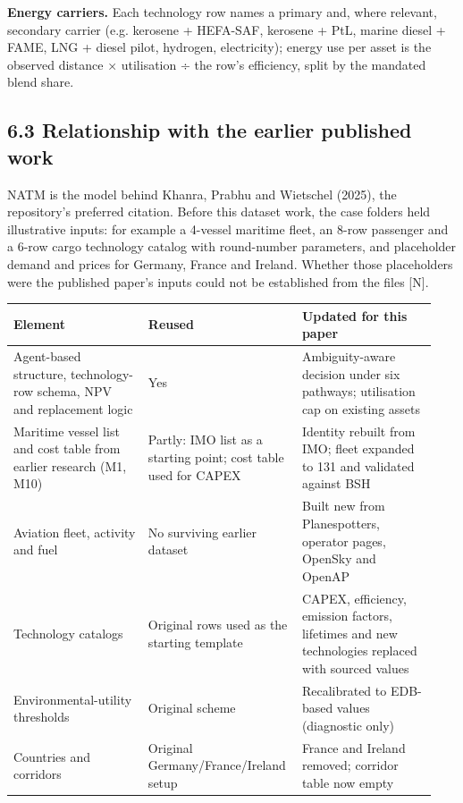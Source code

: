 \documentclass[11pt,a4paper]{article}
\begin{document}
\textbf{Energy carriers.} Each technology row names a primary and, where relevant, secondary carrier (e.g. kerosene + HEFA-SAF, kerosene + PtL, marine diesel + FAME, LNG + diesel pilot, hydrogen, electricity); energy use per asset is the observed distance × utilisation ÷ the row's efficiency, split by the mandated blend share.

\subsection*{6.3 Relationship with the earlier published work}

NATM is the model behind Khanra, Prabhu and Wietschel (2025), the repository's preferred citation. Before this dataset work, the case folders held illustrative inputs: for example a 4-vessel maritime fleet, an 8-row passenger and a 6-row cargo technology catalog with round-number parameters, and placeholder demand and prices for Germany, France and Ireland. Whether those placeholders were the published paper's inputs could not be established from the files [N].

{\small\setlength{\tabcolsep}{3pt}
\begin{longtable}{>{\raggedright\arraybackslash}p{0.315\linewidth}>{\raggedright\arraybackslash}p{0.315\linewidth}>{\raggedright\arraybackslash}p{0.315\linewidth}}
\toprule
\textbf{Element} & \textbf{Reused} & \textbf{Updated for this paper} \tabularnewline
\midrule
\endhead
Agent-based structure, technology-row schema, NPV and replacement logic & Yes & Ambiguity-aware decision under six pathways; utilisation cap on existing assets \tabularnewline
Maritime vessel list and cost table from earlier research (M1, M10) & Partly: IMO list as a starting point; cost table used for CAPEX & Identity rebuilt from IMO; fleet expanded to 131 and validated against BSH \tabularnewline
Aviation fleet, activity and fuel & No surviving earlier dataset & Built new from Planespotters, operator pages, OpenSky and OpenAP \tabularnewline
Technology catalogs & Original rows used as the starting template & CAPEX, efficiency, emission factors, lifetimes and new technologies replaced with sourced values \tabularnewline
Environmental-utility thresholds & Original scheme & Recalibrated to EDB-based values (diagnostic only) \tabularnewline
Countries and corridors & Original Germany/France/Ireland setup & France and Ireland removed; corridor table now empty \tabularnewline
\bottomrule
\end{longtable}}
\end{document}
